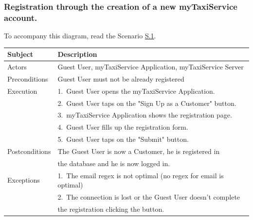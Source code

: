 \subsubsection{Registration through the creation of a new myTaxiService account.}
			To accompany this diagram, read the Scenario \hyperref[sec:NormalCustomerRegistrationScenario]{S.1}.

				\begin{table}[htpb]
					\centering
					\label{tab:NormalCustomerRegistrationDiagramTable}
					\begin{tabularx}{\textwidth}{lp{9cm}}
						\hline
						\hline
							\textbf{Subject}
						& 
							\textbf{Description}\\
						\hline
							Actors	       &  Guest User, myTaxiService Application, myTaxiService Server\\
						\hline
							Preconditions  &  Guest User must not be already registered\\
						\hline
							Execution      &  1.~Guest User opens the myTaxiService Application.\\
										   &  2.~Guest User taps on the "Sign Up as a Customer" button.\\
										   &  3.~myTaxiService Application shows the registration page.\\
										   &  4.~Guest User fills up the registration form.\\
										   &  5.~Guest User taps on the "Submit" button.\\
						\hline
							Postconditions &  The Guest User is now a Customer, he is registered in \\ 
										   &  the database and he is now logged in.\\
						\hline
							Exceptions     &  1.~The email regex is not optimal (no regex for email is optimal)\\
										   &  2.~The connection is lost or the Guest User doesn't complete\\ 
										   &     the registration clicking the button.\\
									
						\hline
						\hline
					\end{tabularx}
				\end{table}
				

